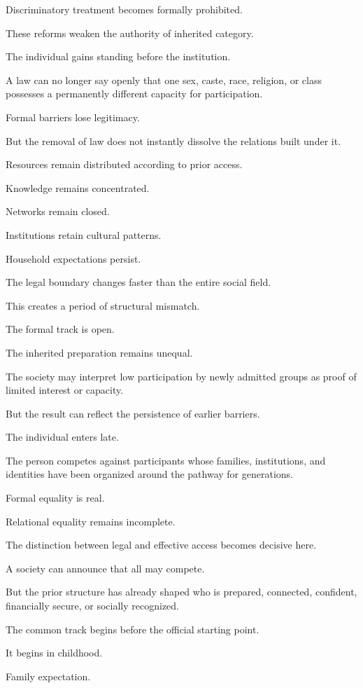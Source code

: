 Discriminatory treatment becomes formally prohibited.

These reforms weaken the authority of inherited category.

The individual gains standing before the institution.

A law can no longer say openly that one sex, caste, race, religion, or class possesses a permanently different capacity for participation.

Formal barriers lose legitimacy.

But the removal of law does not instantly dissolve the relations built under it.

Resources remain distributed according to prior access.

Knowledge remains concentrated.

Networks remain closed.

Institutions retain cultural patterns.

Household expectations persist.

The legal boundary changes faster than the entire social field.

This creates a period of structural mismatch.

The formal track is open.

The inherited preparation remains unequal.

The society may interpret low participation by newly admitted groups as proof of limited interest or capacity.

But the result can reflect the persistence of earlier barriers.

The individual enters late.

The person competes against participants whose families, institutions, and identities have been organized around the pathway for generations.

Formal equality is real.

Relational equality remains incomplete.

The distinction between legal and effective access becomes decisive here.

A society can announce that all may compete.

But the prior structure has already shaped who is prepared, connected, confident, financially secure, or socially recognized.

The common track begins before the official starting point.

It begins in childhood.

Family expectation.


